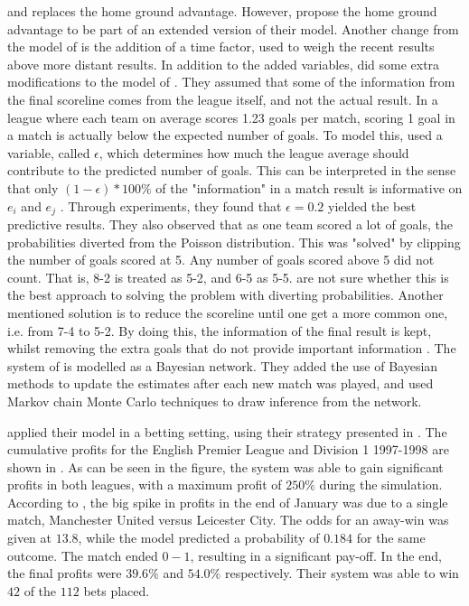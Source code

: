 and replaces the home ground advantage. However, \citet{bib:rue-salvesen-2000} propose the home ground advantage to be part of an extended version of their model. Another change from the model of \citet{bib:maher-1982} is the addition of a time factor, used to weigh the recent results above more distant results. In addition to the added variables, \citet{bib:rue-salvesen-2000} did some extra modifications to the model of \citet{bib:maher-1982}. They assumed that some of the information from the final scoreline comes from the league itself, and not the actual result. In a league where each team on average scores 1.23 goals per match, scoring 1 goal in a match is actually below the expected number of goals. To model this, \citet{bib:rue-salvesen-2000} used a variable, called $\epsilon$, which determines how much the league average should contribute to the predicted number of goals. This can be interpreted in the sense that only $(1 - \epsilon) * 100\%$ of the "information" in a match result is informative on $e_{i}$ and $e_{j}$ \citep{bib:rue-salvesen-2000}. Through experiments, they found that $\epsilon = 0.2$ yielded the best predictive results. They also observed that as one team scored a lot of goals, the probabilities diverted from the Poisson distribution. This was "solved" by clipping the number of goals scored at 5. Any number of goals scored above 5 did not count. That is, 8-2 is treated as 5-2, and 6-5 as 5-5. \citet{bib:rue-salvesen-2000} are not sure whether this is the best approach to solving the problem with diverting probabilities. Another mentioned solution is to reduce the scoreline until one get a more common one, i.e. from 7-4 to 5-2. By doing this, the information of the final result is kept, whilst removing the extra goals that do not provide important information \citep{bib:rue-salvesen-2000}. The system of \citet{bib:rue-salvesen-2000} is modelled as a Bayesian network. They added the use of Bayesian methods to update the estimates after each new match was played, and used Markov chain Monte Carlo techniques to draw inference from the network.

\citet{bib:rue-salvesen-2000} applied their model in a betting setting, using their strategy presented in . The cumulative profits for the English Premier League and Division 1 1997-1998 are shown in . As can be seen in the figure, the system was able to gain significant profits in both leagues, with a maximum profit of $250\%$ during the simulation. According to \citet{bib:rue-salvesen-2000}, the big spike in profits in the end of January was due to a single match, Manchester United versus Leicester City. The odds for an away-win was given at $13.8$, while the model predicted a probability of $0.184$ for the same outcome. The match ended $0-1$, resulting in a significant pay-off. In the end, the final profits were $39.6\%$ and $54.0\%$ respectively. Their system was able to win $42$ of the $112$ bets placed.

